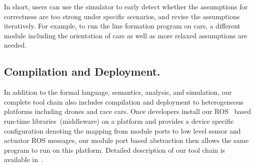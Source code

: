In short, users can use the simulator to early detect whether
the assumptions for correctness are too strong under specific scenarios,
and revise the assumptions iteratively.
For example, to run the line formation program on cars,
a different module including the orientation of cars as well as more relaxed assumptions are needed.

\subsection{Compilation and Deployment.}
In addition to the formal language, semantics, analysis, and simulation,
our complete tool chain also includes compilation and deployment to heterogeneous platforms including drones and race cars.
Once developers install our ROS~\cite{ros} based run-time libraries~(middleware) on a platform
and provides a device specific configuration denoting the mapping from \lgname module ports
to low level sensor and actuator ROS messages,
our module port based abstraction then allows the same \lgname program to run on this platform.
Detailed description of our tool chain is available in~\cite{ghosh2019cyphyhouse}.
